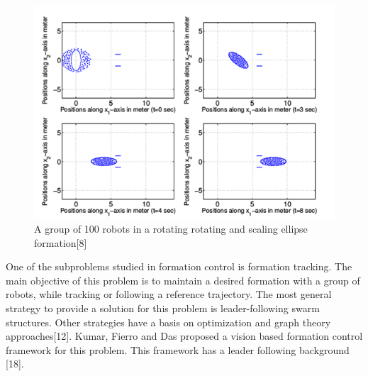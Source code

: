\documentclass[twoside]{article}
\begin{document}
	\begin{figure}[H]
		\caption{A group of 100 robots in a rotating rotating and scaling ellipse formation[8]}
		\centering
		\includegraphics[scale = 1]{slotine}
	\end{figure} 

One of the subproblems studied in formation control is formation tracking. The main objective of this problem is to maintain a desired formation with a group of robots, while tracking or following a reference trajectory. The most general strategy to provide a solution for this problem is leader-following swarm structures. Other strategies have a basis on optimization and graph theory approaches[12]. Kumar, Fierro and Das proposed a vision based formation control framework  for this problem. This framework has a leader following background [18]. 
\end{document}
